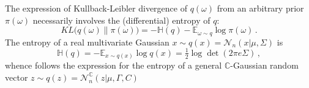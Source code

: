 \documentclass[a4paper,10pt]{article}
\newcommand{\cplx}{\mathbb{C}}
\begin{document}
The expression of Kullback-Leibler divergence of $q(\omega)$ from an arbitrary prior $\pi(\omega)$
necessarily involves the (differential) entropy of $q$:
\begin{equation*}
  KL\bigl(
    q(\omega) \| \pi(\omega)
  \bigr)
    = - \mathbb{H}(q) - \mathbb{E}_{\omega \sim q} \log{\pi(\omega)}
    \,.
\end{equation*}
The entropy of a real multivariate Gaussian $
  x \sim q(x) = \mathcal{N}_n(x \vert \mu, \Sigma)
$ is
$$
\mathbb{H}(q)
  = - \mathbb{E}_{x\sim q(x)} \log{q(x)}
  = \tfrac12 \log \det{(2 \pi e \Sigma)}
  \,, $$
whence follows the expression for the entropy of a general $\cplx$-Gaussian random vector
$
  z \sim q(z)
    = \mathcal{N}^{\cplx}_n(z\vert \mu, \Gamma, C)
$
\end{document}
